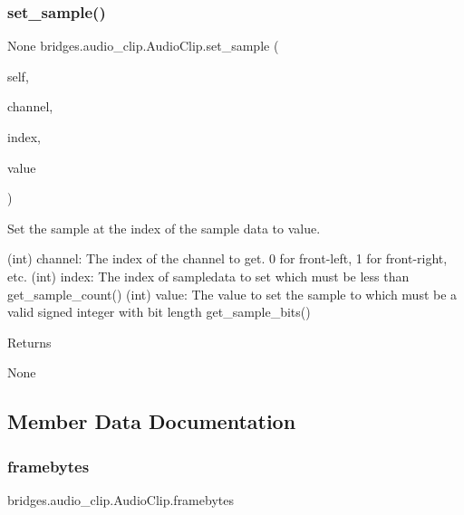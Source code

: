 \subsubsection{\texorpdfstring{set\_sample()}{set\_sample()}}
{\footnotesize\ttfamily  None bridges.\+audio\+\_\+clip.\+Audio\+Clip.\+set\+\_\+sample (\begin{DoxyParamCaption}\item[{}]{self,  }\item[{int}]{channel,  }\item[{int}]{index,  }\item[{int}]{value }\end{DoxyParamCaption})}



Set the sample at the index of the sample data to value. 

\begin{DoxyVerb}       (int) channel: The index of the channel to get. 0 for front-left, 1 for front-right, etc.
       (int) index: The index of sampledata to set which must be less than get_sample_count()
       (int) value: The value to set the sample to which must be a valid signed integer with bit length get_sample_bits()
\end{DoxyVerb}
 \begin{DoxyReturn}{Returns}


None 
\end{DoxyReturn}


\subsection{Member Data Documentation}
\mbox{\label{classbridges_1_1audio__clip_1_1_audio_clip_a8af93e6689978881cc60e7cdf4092ce7}} 
\subsubsection{\texorpdfstring{framebytes}{framebytes}}
{\footnotesize\ttfamily bridges.\+audio\+\_\+clip.\+Audio\+Clip.\+framebytes}

\mbox{\label{classbridges_1_1audio__clip_1_1_audio_clip_ace413dc6646f965e2d0f75e1d84000c9}} 
